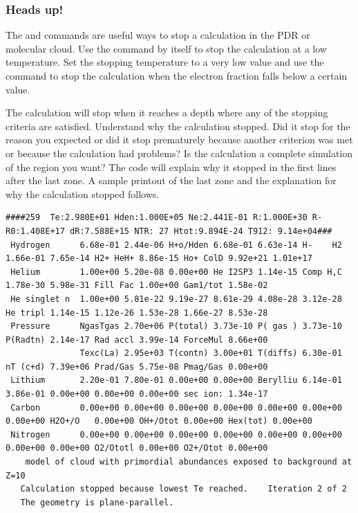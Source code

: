 \documentclass[12pt,twoside]{article}
\begin{document}
\subsubsection{Heads up!}

The  and 
commands are useful ways to stop
a calculation in the PDR or molecular cloud.
Use the 
command by itself to stop the calculation at a low temperature.
Set the stopping temperature to a very low value
and use the  command
to stop the calculation when the electron fraction falls below a certain
value.

The calculation will stop when it reaches a depth where any of the
stopping criteria are satisfied.
Understand why the calculation stopped.
Did it stop for the reason you expected or did it stop prematurely because
another criterion was met or because the calculation had problems?  Is the
calculation a complete simulation of the region you want?  The code will
explain why it stopped in the first lines after the last zone.
A sample printout of the last zone and the explanation for why the calculation stopped follows.

\label{sec:ZoneOutput}
{\setverbatimfontsize{\tiny}
\begin{verbatim}
####259  Te:2.980E+01 Hden:1.000E+05 Ne:2.441E-01 R:1.000E+30 R-R0:1.408E+17 dR:7.588E+15 NTR: 27 Htot:9.894E-24 T912: 9.14e+04###
 Hydrogen      6.68e-01 2.44e-06 H+o/Hden 6.68e-01 6.63e-14 H-    H2 1.66e-01 7.65e-14 H2+ HeH+ 8.86e-15 Ho+ ColD 9.92e+21 1.01e+17
 Helium        1.00e+00 5.20e-08 0.00e+00 He I2SP3 1.14e-15 Comp H,C 1.78e-30 5.98e-31 Fill Fac 1.00e+00 Gam1/tot 1.58e-02
 He singlet n  1.00e+00 5.81e-22 9.19e-27 8.61e-29 4.08e-28 3.12e-28 He tripl 1.14e-15 1.12e-26 1.53e-28 1.66e-27 8.53e-28
 Pressure      NgasTgas 2.70e+06 P(total) 3.73e-10 P( gas ) 3.73e-10 P(Radtn) 2.14e-17 Rad accl 3.99e-14 ForceMul 8.66e+00
               Texc(La) 2.95e+03 T(contn) 3.00e+01 T(diffs) 6.30e-01 nT (c+d) 7.39e+06 Prad/Gas 5.75e-08 Pmag/Gas 0.00e+00
 Lithium       2.20e-01 7.80e-01 0.00e+00 0.00e+00 Berylliu 6.14e-01 3.86e-01 0.00e+00 0.00e+00 0.00e+00 sec ion: 1.34e-17
 Carbon        0.00e+00 0.00e+00 0.00e+00 0.00e+00 0.00e+00 0.00e+00 0.00e+00 H2O+/O   0.00e+00 OH+/Otot 0.00e+00 Hex(tot) 0.00e+00
 Nitrogen      0.00e+00 0.00e+00 0.00e+00 0.00e+00 0.00e+00 0.00e+00 0.00e+00 0.00e+00 O2/Ototl 0.00e+00 O2+/Otot 0.00e+00
    model of cloud with primordial abundances exposed to background at Z=10
   Calculation stopped because lowest Te reached.    Iteration 2 of 2
   The geometry is plane-parallel.
\end{verbatim}
}
\end{document}
